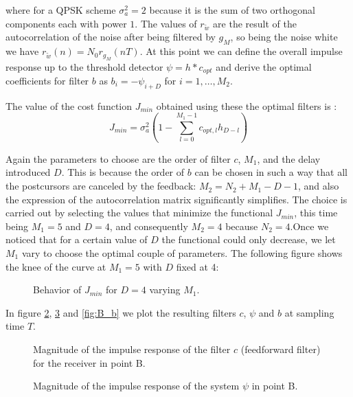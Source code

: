 \documentclass[a4paper,11.5pt]{article}
\begin{document}
where for a QPSK scheme $\sigma_a^2=2$ because it is the sum of two orthogonal components each with power $1$. The values of $r_{\tilde{w}}$ are the result of the autocorrelation of the noise after being filtered by $g_M$, so being the noise white we have $r_{\tilde{w}}(n)=N_0r_{g_M}(nT)$. At this point we can define the overall impulse response up to the threshold detector $\psi = h*c_{opt}$ and derive the optimal coefficients for filter $b$ as $b_i=-\psi_{i+D}$ for $i=1,\dots,M_2$.

The value of the cost function $J_{min}$ obtained using these the optimal filters is :
\begin{equation} \label{eq:jmin}
J_{min} = \sigma^2_a \left( 1-\sum_{l=0}^{M_1-1} c_{opt,l}h_{D-l}\right)
\end{equation}

Again the parameters to choose are the order of filter $c$, $M_1$, and the delay introduced $D$. This is because the order of $b$ can be chosen in such a way that all the postcursors are canceled by the feedback: $M_2=N_2+M_1-D-1$, and also the expression of the autocorrelation matrix significantly simplifies. The choice is carried out by selecting the values that minimize the functional $J_{min}$, this time being $M_1=5$ and $D=4$, and consequently $M_2=4$ because $N_2=4$.Once we noticed that for a certain value of $D$ the functional could only decrease, we let $M_1$ vary to choose the optimal couple of parameters. The following figure shows the knee of the curve at $M_1=5$ with $D$ fixed at 4:

\begin{figure}[H]
	\begin{center}   
		\caption{Behavior of $J_{min}$ for $D=4$ varying $M_1$.}
		\label{fig:B_Jmin}
	\end{center}
\end{figure}


In figure \ref{fig:B_c}, \ref{fig:B_psi} and \ref{fig:B_b} we plot the resulting filters $c$, $\psi$ and $b$ at sampling time $T$. 

\begin{figure}[H]
	\begin{center}   
		\caption{Magnitude of the impulse response of the filter $c$ (feedforward filter) for the receiver in point B.}
		\label{fig:B_c}
	\end{center}
\end{figure}

\begin{figure}[H]
	\begin{center}   
		\caption{Magnitude of the impulse response of the system $\psi$ in point B.}
		\label{fig:B_psi}
	\end{center}
\end{figure}
\end{document}
